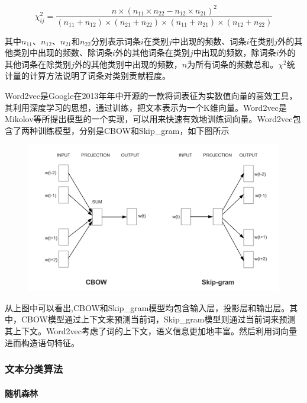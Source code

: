 \[
\chi_{ij}^2=\frac{n\times (n_{11}\times n_{22}-n_{12}\times n_{21})^2}{(n_{11}+n_{12})\times (n_{21}+n_{22})\times (n_{11}+n_{21})\times (n_{12}+n_{22})}
\]

其中\(n_{11}、n_{12}、n_{21}\)和\(n_{22}\)分别表示词条\(i\)在类别\(j\)中出现的频数、词条\(i\)在类别\(j\)外的其他类别中出现的频数、除词条\(i\)外的其他词条在类别\(j\)中出现的频数，除词条\(i\)外的其他词条在除类别\(j\)外的其他类别中出现的频数，\(n\)为所有词条的频数总和。\(\chi^2\)统计量的计算方法说明了词条对类别贡献程度。

Word2vec是Google在2013年年中开源的一款将词表征为实数值向量的高效工具，其利用深度学习的思想，通过训练，把文本表示为一个K维向量。Word2vec是Mikolov等所提出模型的一个实现，可以用来快速有效地训练词向量。Word2vec包含了两种训练模型，分别是CBOW和Skip\_gram，如下图所示

\begin{figure}[htbp]
\centering
\includegraphics{./images/word2vec.png}
\caption{}
\end{figure}

从上图中可以看出,CBOW和Skip\_gram模型均包含输入层，投影层和输出层。其中，CBOW模型通过上下文来预测当前词，Skip\_gram模型则通过当前词来预测其上下文。Word2vec考虑了词的上下文，语义信息更加地丰富。然后利用词向量进而构造语句特征。

\subsubsection{文本分类算法}\label{ux6587ux672cux5206ux7c7bux7b97ux6cd5}

\paragraph{随机森林}\label{ux968fux673aux68eeux6797}

